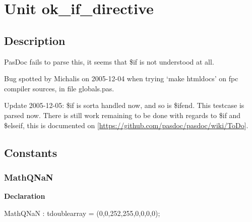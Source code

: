 \documentclass{report}
\newif\ifpdf
\begin{document}
\label{toc}\tableofcontents
\newpage
\newlength{\tmplength}
\chapter{Unit ok{\_}if{\_}directive}
\label{ok_if_directive}
\section{Description}
PasDoc fails to parse this, it seems that {\$}if is not understood at all.\hfill\vspace*{1ex}



Bug spotted by Michalis on 2005{-}12{-}04 when trying `make htmldocs' on fpc compiler sources, in file globals.pas.

Update 2005{-}12{-}05: {\$}if is sorta handled now, and so is {\$}ifend. This testcase is parsed now. There is still work remaining to be done with regards to {\$}if and {\$}elseif, this is documented on [\href{https://github.com/pasdoc/pasdoc/wiki/ToDo}{https://github.com/pasdoc/pasdoc/wiki/ToDo}].
\section{Constants}
\ifpdf
\subsection*{\large{\textbf{MathQNaN}}\normalsize\hspace{1ex}\hrulefill}
\else
\subsection*{MathQNaN}
\fi
\label{ok_if_directive-MathQNaN}
\begin{list}{}{
\setlength{\itemindent}{0cm}
\setlength{\listparindent}{0cm}
\setlength{\leftmargin}{\evensidemargin}
\addtolength{\leftmargin}{\tmplength}
\settowidth{\labelsep}{X}
\addtolength{\leftmargin}{\labelsep}
\setlength{\labelwidth}{\tmplength}
}
\item[\textbf{Declaration}\hfill]
\ifpdf
\begin{flushleft}
\fi
\begin{ttfamily}
MathQNaN : tdoublearray = (0,0,252,255,0,0,0,0);\end{ttfamily}

\ifpdf
\end{flushleft}
\fi

\end{list}
\ifpdf
\end{document}
